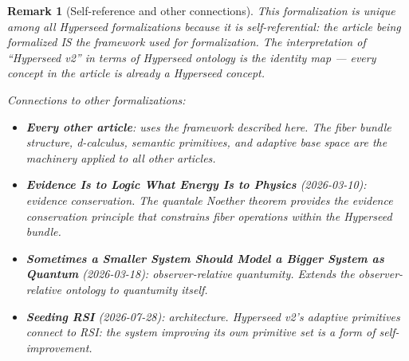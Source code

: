 \documentclass[11pt,a4paper]{article}
\newtheorem{remark}[definition]{Remark}
\begin{document}
\begin{remark}[Self-reference and other connections]
This formalization is unique among all Hyperseed formalizations because
it is self-referential: the article being formalized IS the framework
used for formalization. The interpretation of ``Hyperseed v2'' in terms
of Hyperseed ontology is the identity map --- every concept in the
article is already a Hyperseed concept.

Connections to other formalizations:
\begin{itemize}
\item \textbf{Every other article}: uses the framework described here.
  The fiber bundle structure, d-calculus, semantic primitives, and
  adaptive base space are the machinery applied to all other articles.
\item \textbf{Evidence Is to Logic What Energy Is to Physics} (2026-03-10):
  evidence conservation. The quantale Noether theorem provides the
  evidence conservation principle that constrains fiber operations
  within the Hyperseed bundle.
\item \textbf{Sometimes a Smaller System Should Model a Bigger System
  as Quantum} (2026-03-18): observer-relative quantumity. Extends the
  observer-relative ontology to quantumity itself.
\item \textbf{Seeding RSI} (2026-07-28): architecture. Hyperseed v2's
  adaptive primitives connect to RSI: the system improving its own
  primitive set is a form of self-improvement.
\end{itemize}
\end{remark}
\end{document}
